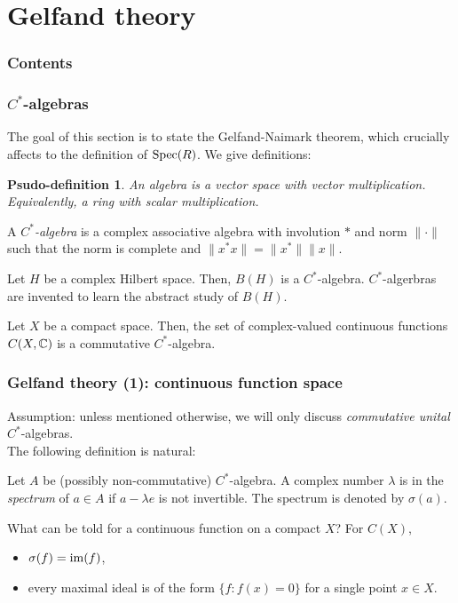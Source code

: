 \documentclass[10pt,handout]{beamer}
\begin{document}
\section{Gelfand theory}
\begin{frame}
\frametitle{Contents}
  \tableofcontents[currentsection]
\end{frame}

\newtheorem{pdefn}{Psudo-definition}
\begin{frame}
\frametitle{$C^*$-algebras}
  The goal of this section is to state the Gelfand-Naimark theorem, which crucially affects to the definition of $\operatorname{Spec}(R)$.
  \pause We give definitions:
  \begin{pdefn}
    An \emph{algebra} is a vector space with vector multiplication.\\
    Equivalently, a ring with scalar multiplication.
  \end{pdefn}
  \pause
  \begin{defn}
    A \emph{$C^*$-algebra} is a complex associative algebra with involution $*$ and norm $\|\cdot\|$ such that the norm is complete and $\|x^*x\|=\|x^*\|\|x\|$.
  \end{defn}
  \pause
  \begin{ex}[1]
    Let $H$ be a complex Hilbert space.
    Then, $B(H)$ is a $C^*$-algebra.
    $C^*$-algerbras are invented to learn the abstract study of $B(H)$.
  \end{ex}
  \pause
  \begin{ex}[2]
    Let $X$ be a compact space.
    Then, the set of complex-valued continuous functions $C(X,\mathbb{C})$ is a commutative $C^*$-algebra.
  \end{ex}
\end{frame}

\begin{frame}
\frametitle{Gelfand theory (1): continuous function space}
  Assumption: unless mentioned otherwise, we will only discuss \emph{commutative unital} $C^*$-algebras.\\
  \smallskip\pause The following definition is natural:
  \begin{defn}
    Let $A$ be (possibly non-commutative) $C^*$-algebra.
    A complex number $\lambda$ is in the \emph{spectrum} of $a\in A$ if $a-\lambda e$ is not invertible.
    The spectrum is denoted by $\sigma(a)$.
  \end{defn}
  \bigskip\pause
  What can be told for a continuous function on a compact $X$? For $C(X)$,\pause
  \begin{itemize}[<+->]
    \item $\sigma(f)=\operatorname{im}(f)$,
    \item every maximal ideal is of the form $\{f:f(x)=0\}$ for a single point $x\in X$.
  \end{itemize}
\end{frame}
\end{document}
